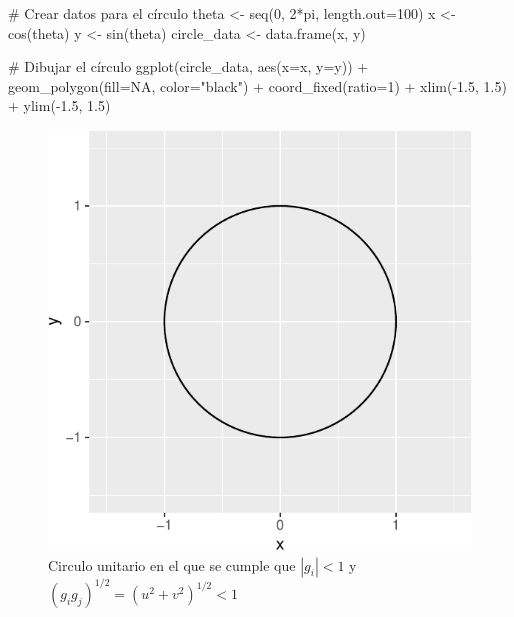 \documentclass[
  a4paper,
]{article}
\newenvironment{Shaded}{}{}
\newcommand{\AttributeTok}[1]{\textcolor[rgb]{0.84,0.23,0.29}{#1}}
\newcommand{\CommentTok}[1]{\textcolor[rgb]{0.42,0.45,0.49}{#1}}
\newcommand{\ConstantTok}[1]{\textcolor[rgb]{0.00,0.36,0.77}{#1}}
\newcommand{\DecValTok}[1]{\textcolor[rgb]{0.00,0.36,0.77}{#1}}
\newcommand{\FloatTok}[1]{\textcolor[rgb]{0.00,0.36,0.77}{#1}}
\newcommand{\FunctionTok}[1]{\textcolor[rgb]{0.44,0.26,0.76}{#1}}
\newcommand{\NormalTok}[1]{\textcolor[rgb]{0.14,0.16,0.18}{#1}}
\newcommand{\OtherTok}[1]{\textcolor[rgb]{0.44,0.26,0.76}{#1}}
\newcommand{\SpecialCharTok}[1]{\textcolor[rgb]{0.00,0.36,0.77}{#1}}
\newcommand{\StringTok}[1]{\textcolor[rgb]{0.01,0.18,0.38}{#1}}
\begin{document}
\begin{Shaded}
\begin{Highlighting}[]
\CommentTok{\# Crear datos para el círculo}
\NormalTok{theta }\OtherTok{\textless{}{-}} \FunctionTok{seq}\NormalTok{(}\DecValTok{0}\NormalTok{, }\DecValTok{2}\SpecialCharTok{*}\NormalTok{pi, }\AttributeTok{length.out=}\DecValTok{100}\NormalTok{)}
\NormalTok{x }\OtherTok{\textless{}{-}} \FunctionTok{cos}\NormalTok{(theta)}
\NormalTok{y }\OtherTok{\textless{}{-}} \FunctionTok{sin}\NormalTok{(theta)}
\NormalTok{circle\_data }\OtherTok{\textless{}{-}} \FunctionTok{data.frame}\NormalTok{(x, y)}

\CommentTok{\# Dibujar el círculo}
\FunctionTok{ggplot}\NormalTok{(circle\_data, }\FunctionTok{aes}\NormalTok{(}\AttributeTok{x=}\NormalTok{x, }\AttributeTok{y=}\NormalTok{y)) }\SpecialCharTok{+}
  \FunctionTok{geom\_polygon}\NormalTok{(}\AttributeTok{fill=}\ConstantTok{NA}\NormalTok{, }\AttributeTok{color=}\StringTok{"black"}\NormalTok{) }\SpecialCharTok{+}
  \FunctionTok{coord\_fixed}\NormalTok{(}\AttributeTok{ratio=}\DecValTok{1}\NormalTok{) }\SpecialCharTok{+}
  \FunctionTok{xlim}\NormalTok{(}\SpecialCharTok{{-}}\FloatTok{1.5}\NormalTok{, }\FloatTok{1.5}\NormalTok{) }\SpecialCharTok{+}
  \FunctionTok{ylim}\NormalTok{(}\SpecialCharTok{{-}}\FloatTok{1.5}\NormalTok{, }\FloatTok{1.5}\NormalTok{)}
\end{Highlighting}
\end{Shaded}

\begin{figure}[H]

\caption{Circulo unitario en el que se cumple que \(|g_i|<1\) y
\((g_i g_j)^{1/2} = (u^2 + v^2)^{1/2} < 1\)}

{\centering \includegraphics{index_files/figure-pdf/fig24-1.pdf}

}

\end{figure}%
\end{document}
